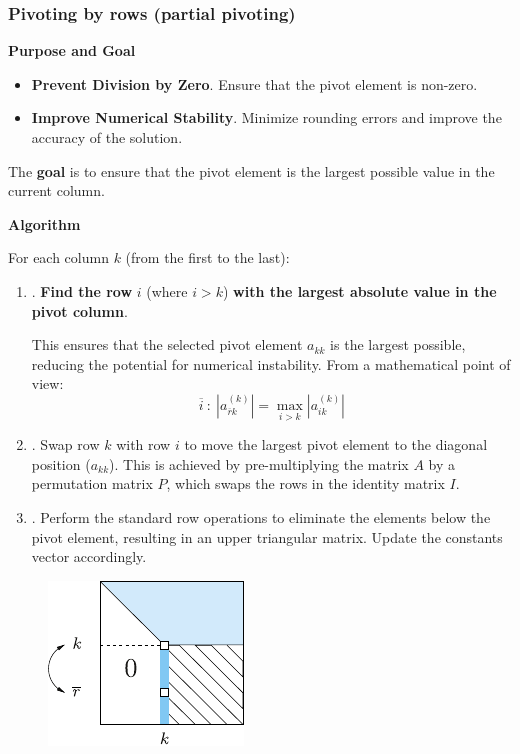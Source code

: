 \subsubsection{Pivoting by rows (partial pivoting)}

\begin{flushleft}
    \textcolor{Green3}{ \textbf{Purpose and Goal}}
\end{flushleft}
\begin{itemize}
    \item \textbf{Prevent Division by Zero}. Ensure that the pivot element is non-zero.
    \item \textbf{Improve Numerical Stability}. Minimize rounding errors and improve the accuracy of the solution.
\end{itemize}
The \textbf{goal} is to ensure that the pivot element is the largest possible value in the current column.

\highspace
\begin{flushleft}
    \textcolor{Green3}{ \textbf{Algorithm}}
\end{flushleft}
For each column $k$ (from the first to the last):
\begin{enumerate}
    \item {}. \textbf{Find the row} $i$ (where $i > k$) \textbf{with the largest absolute value in the pivot column}.
    
    This ensures that the selected pivot element $a_{kk}$ is the largest possible, reducing the potential for numerical instability. From a mathematical point of view:
    \begin{equation*}
        \overline{i} \: : \: \left|
            a_{\overline{r}k}^{\left(k\right)}
        \right| = \underset{
            i > k
        }{\max}
        \left|
            a_{ik}^{\left(k\right)}
        \right|
    \end{equation*}


    \item {}. Swap row $k$ with row $i$ to move the largest pivot element to the diagonal position ($a_{kk}$). This is achieved by pre-multiplying the matrix $A$ by a permutation matrix $P$, which swaps the rows in the identity matrix $I$.

    \item {}. Perform the standard row operations to eliminate the elements below the pivot element, resulting in an upper triangular matrix. Update the constants vector accordingly.
\end{enumerate}
\begin{figure}[!htp]
    \centering
    \includegraphics[width=.4\textwidth]{img/pivoting-by-rows-1.pdf}
\end{figure}
